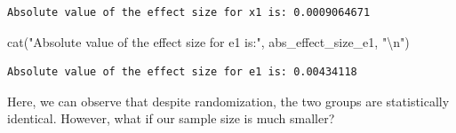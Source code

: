\documentclass[
  letterpaper,
  DIV=11,
  numbers=noendperiod]{scrreprt}
\newenvironment{Shaded}{\begin{snugshade}}{\end{snugshade}}
\newcommand{\FunctionTok}[1]{\textcolor[rgb]{0.28,0.35,0.67}{#1}}
\newcommand{\NormalTok}[1]{\textcolor[rgb]{0.00,0.23,0.31}{#1}}
\newcommand{\OtherTok}[1]{\textcolor[rgb]{0.00,0.23,0.31}{#1}}
\newcommand{\SpecialCharTok}[1]{\textcolor[rgb]{0.37,0.37,0.37}{#1}}
\newcommand{\StringTok}[1]{\textcolor[rgb]{0.13,0.47,0.30}{#1}}
\begin{document}
\begin{Shaded}
\end{Shaded}

\begin{verbatim}
Absolute value of the effect size for x1 is: 0.0009064671 
\end{verbatim}

\begin{Shaded}
\begin{Highlighting}[]
\FunctionTok{cat}\NormalTok{(}\StringTok{"Absolute value of the effect size for e1 is:"}\NormalTok{, abs\_effect\_size\_e1, }\StringTok{"}\SpecialCharTok{\textbackslash{}n}\StringTok{"}\NormalTok{)}
\end{Highlighting}
\end{Shaded}

\begin{verbatim}
Absolute value of the effect size for e1 is: 0.00434118 
\end{verbatim}

Here, we can observe that despite randomization, the two groups are
statistically identical. However, what if our sample size is much
smaller?
\end{document}
